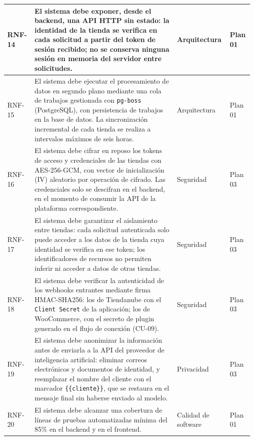\begin{longtable}{|m{1.5cm}|m{8.4cm}|m{2.4cm}|m{2.6cm}|}
RNF-14 & El sistema debe exponer, desde el backend, una API HTTP sin estado: la identidad de la tienda se verifica en cada solicitud a partir del token de sesión recibido; no se conserva ninguna sesión en memoria del servidor entre solicitudes. & Arquitectura & Plan 01 \\
\hline

RNF-15 & El sistema debe ejecutar el procesamiento de datos en segundo plano mediante una cola de trabajos gestionada con \texttt{pg-boss} (PostgreSQL), con persistencia de trabajos en la base de datos. La sincronización incremental de cada tienda se realiza a intervalos máximos de seis horas. & Arquitectura & Plan 01 \\
\hline

RNF-16 & El sistema debe cifrar en reposo los tokens de acceso y credenciales de las tiendas con AES-256-GCM, con vector de inicialización (IV) aleatorio por operación de cifrado. Las credenciales solo se descifran en el backend, en el momento de consumir la API de la plataforma correspondiente. & Seguridad & Plan 03 \\
\hline

RNF-17 & El sistema debe garantizar el aislamiento entre tiendas: cada solicitud autenticada solo puede acceder a los datos de la tienda cuya identidad se verifica en ese token; los identificadores de recursos no permiten inferir ni acceder a datos de otras tiendas. & Seguridad & Plan 03 \\
\hline

RNF-18 & El sistema debe verificar la autenticidad de los webhooks entrantes mediante firma HMAC-SHA256: los de Tiendanube con el \texttt{Client Secret} de la aplicación; los de WooCommerce, con el secreto de plugin generado en el flujo de conexión (CU-09). & Seguridad & Plan 03 \\
\hline

RNF-19 & El sistema debe anonimizar la información antes de enviarla a la API del proveedor de inteligencia artificial: eliminar correos electrónicos y documentos de identidad, y reemplazar el nombre del cliente con el marcador \texttt{\{\{cliente\}\}}, que se restaura en el mensaje final sin haberse enviado al modelo. & Privacidad & Plan 03 \\
\hline

RNF-20 & El sistema debe alcanzar una cobertura de líneas de pruebas automatizadas mínima del 85\% en el backend y en el frontend.
& Calidad de software & Plan 01 \\
\hline


\end{longtable}
